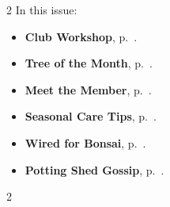 \setlength{\columnsep}{-5.0cm}
\begin{multicols}{2}
    \noindent\textsf{In this issue:}
    \begin{itemize}
        \item \textsf{\textbf{Club Workshop}}, p.~\pageref{2025-03-workshop}.
        \item \textsf{\textbf{Tree of the Month}}, p.~\pageref{2025-03-contest}.
        \item \textsf{\textbf{Meet the Member}}, p.~\pageref{2025-03-roots}.
        \item \textsf{\textbf{Seasonal Care Tips}}, p.~\pageref{2025-03-care}.
        \item \textsf{\textbf{Wired for Bonsai}}, p.~\pageref{2025-03-wired}.
        \item \textsf{\textbf{Potting Shed Gossip}}, p.~\pageref{2025-03-gossip}.
    \end{itemize}
    \vfill\null
    \columnbreak

    
\end{multicols}
\pagebreak

\setlength{\columnsep}{0.5cm}
\begin{multicols}{2}
    
    
%    
    
    
    
%    
%    
    
\end{multicols}
